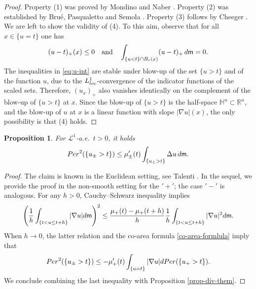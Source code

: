 \documentclass[11pt, reqno]{amsart}
\newtheorem{proposition}{Proposition}[section]
\numberwithin{equation}{section}
\begin{document}
\begin{proof}
		Property (1) was proved by Mondino and Naber \cite[Corollary 1.2]{MN-JEMS}. Property (2) was established by Bru\'e, Pasqualetto and Semola \cite[Theorem 3.2]{BPS}. Property (3) follows by  Cheeger \cite[Theorem 10.2]{Cheeger}. We are left to show the validity of (4). To this aim, observe that for all $x\in \{u=t\}$ one has
		\begin{equation}\label{eq:u-int}
			(u-t)_+(x)\leq 0 \quad \text{and} \quad \int_{\{u<t\}\cap B_r(x)}(u-t)_+ \,{\rm d}{\sf m}=0.
		\end{equation}
		The inequalities in \eqref{eq:u-int} are stable under blow-up of the set $\{u>t\}$ and of the function $u$, due to the $L^1_{\rm loc}$-convergence of the indicator functions of the scaled sets. Therefore,  $(u_x)_+$ also vanishes identically on the complement of the blow-up of $\{u>t\}$ at $x$. Since the blow-up of $\{u>t\}$ is the half-space ${\mathbb H}^n\subset {\mathbb R}^n$, and the blow-up of $u$ at $x$ is a linear function with slope $|\nabla u|(x)$, the only possibility is that (4) holds.
	\end{proof}
	
	\begin{proposition}\label{isoperi-prop}
		For $\mathcal L^1$-a.e.\ $t>0$,  it holds 
		$$
		{\rm Per}^2(\{u_\pm>t\})\leq \mu_\pm'(t)\int_{\{u_\pm>t\}}\Delta u\, {\rm d}{\sf m}.
		$$
	\end{proposition}
	\begin{proof} The claim is known in the Euclidean setting, see  Talenti \cite[Appendix, p.\ 278]{Talenti}. In the sequel, we provide the proof in the non-smooth setting for the $'+'$; the case $'-'$  is analogous.    For any $h>0$, Cauchy--Schwarz inequality implies
	$$\left(\frac{1}{h}\int_{\{t<u\leq t+h\}}|\nabla u|{\rm d}{\sf m}\right)^2\leq \frac{\mu_+(t)-\mu_+(t+h)}{h}\frac{1}{h}\int_{\{t<u\leq t+h\}}|\nabla u|^2{\rm d}{\sf m}.$$
	When $h\to 0$, the latter relation and the co-area formula \eqref{co-area-formlula} imply that
	\begin{equation}\label{eq:Per2leq}
		{\rm Per}^2(\{u_\pm>t\}) \leq -\mu_+'(t)\int_{\{u=t\}}|\nabla u|{\rm d}{\rm Per}(\{u_+>t\}).
	\end{equation}
	We conclude combining the last inequality with Proposition \ref{prop-div-them}.
	\end{proof}
	
	
	
	
\end{document}
